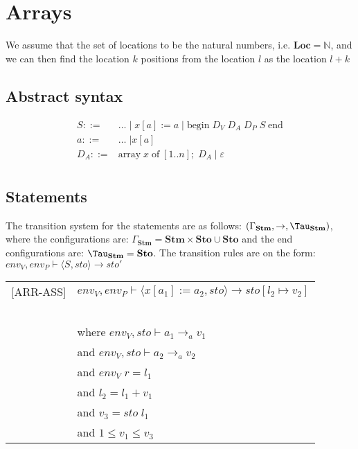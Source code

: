 \chapter{Arrays}
We assume that the set of locations to be the natural numbers, i.e. $\textbf{Loc} = \mathbb{N}$, and we can then find the location $k$ positions from the location $l$ as the location $l + k$

\section{Abstract syntax}
\begin{align*}
S::= & \dots \; | \; x[a]:= a \; | \; \text{begin} \; D_V \; D_A \; D_P \; S \; \text{end} \\
a::= & \dots \; | x[a] \\
D_A::= & \text{array} \; x \; \text{of} \;  [1..n]; \; D_A \; | \; \varepsilon \\
\end{align*}

\section{Statements}
The transition system for the statements are as follows: $(\Gamma_{\mathbf{Stm}}, \rightarrow, \Tau_{\mathbf{Stm}})$, where the configurations are: $\Gamma_{\mathbf{Stm}} = \textbf{Stm} \times \textbf{Sto} \cup \textbf{Sto}$ and the end configurations are: $\Tau_{\mathbf{Stm}} = \textbf{Sto}$.
The transition rules are on the form: $env_V, env_P \vdash \langle S, sto \rangle \rightarrow sto'$

\begin{table}[H]
\begin{tabular}{l l}
[ARR-ASS] & $env_V, env_P \vdash \langle x[a_1]:= a_2, sto \rangle \rightarrow sto[l_2 \mapsto v_2]$ \\
~ & ~ \\
~ & \indent\indent where $env_V, sto \vdash a_1 \rightarrow_a v_1$ \\
~ & \indent\indent and $env_V, sto \vdash a_2 \rightarrow_a v_2$ \\
~ & \indent\indent and $env_V \; r = l_1$ \\
~ & \indent\indent and $l_2 = l_1 + v_1$ \\
~ & \indent\indent and $v_3 = sto \; l_1$ \\
~ & \indent\indent and $1 \leq v_1 \leq v_3$ \\
\end{tabular}
\end{table}


